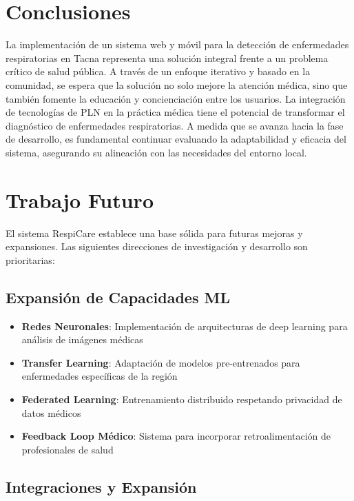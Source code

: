 \documentclass[12pt,a4paper]{article}
\begin{document}
\section{Conclusiones}
La implementación de un sistema web y móvil para la detección de enfermedades respiratorias en Tacna representa una solución integral frente a un problema crítico de salud pública. A través de un enfoque iterativo y basado en la comunidad, se espera que la solución no solo mejore la atención médica, sino que también fomente la educación y concienciación entre los usuarios. La integración de tecnologías de PLN en la práctica médica tiene el potencial de transformar el diagnóstico de enfermedades respiratorias. A medida que se avanza hacia la fase de desarrollo, es fundamental continuar evaluando la adaptabilidad y eficacia del sistema, asegurando su alineación con las necesidades del entorno local.

\section{Trabajo Futuro}

El sistema RespiCare establece una base sólida para futuras mejoras y expansiones. Las siguientes direcciones de investigación y desarrollo son prioritarias:

\subsection{Expansión de Capacidades ML}

\begin{itemize}
    \item \textbf{Redes Neuronales}: Implementación de arquitecturas de deep learning para análisis de imágenes médicas
    \item \textbf{Transfer Learning}: Adaptación de modelos pre-entrenados para enfermedades específicas de la región
    \item \textbf{Federated Learning}: Entrenamiento distribuido respetando privacidad de datos médicos
    \item \textbf{Feedback Loop Médico}: Sistema para incorporar retroalimentación de profesionales de salud
\end{itemize}

\subsection{Integraciones y Expansión}
\end{document}
